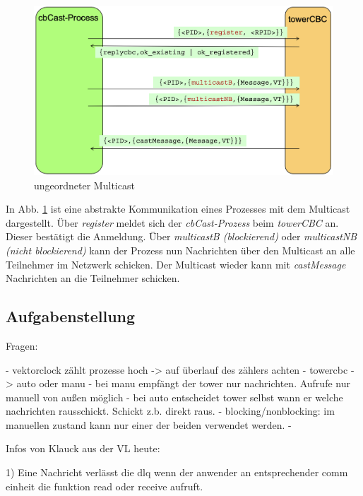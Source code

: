 \begin{figure}[htbp]
\begin{center}
\includegraphics[scale=0.4]{Latex/Bilder/towerCBC_1.png}
\caption{\label{fig:towerCBC} ungeordneter Multicast \cite{Aufgabenstellung}} 
\end{center}
\end{figure}

In Abb. \ref{fig:towerCBC} ist eine abstrakte Kommunikation eines Prozesses mit dem Multicast dargestellt. Über \textit{register} meldet sich der \textit{cbCast-Prozess} beim \textit{towerCBC} an. Dieser bestätigt die Anmeldung. Über \textit{multicastB (blockierend)} oder \textit{multicastNB (nicht blockierend)} kann der Prozess nun Nachrichten über den Multicast an alle Teilnehmer im Netzwerk schicken. Der Multicast wieder kann mit \textit{castMessage} Nachrichten an die Teilnehmer schicken.

\subsection{Aufgabenstellung}


Fragen:

- vektorclock zählt prozesse hoch -> auf überlauf des zählers achten
- towercbc -> auto oder manu
    - bei manu empfängt der tower nur nachrichten. Aufrufe nur manuell von außen möglich
    - bei auto entscheidet tower selbst wann er welche nachrichten rausschickt. Schickt z.b. direkt raus.
- blocking/nonblocking: im manuellen zustand kann nur einer der beiden verwendet werden.
- 


Infos von Klauck aus der VL heute:

1) Eine Nachricht verlässt die dlq wenn der anwender an entsprechender comm einheit die funktion read oder receive aufruft.

